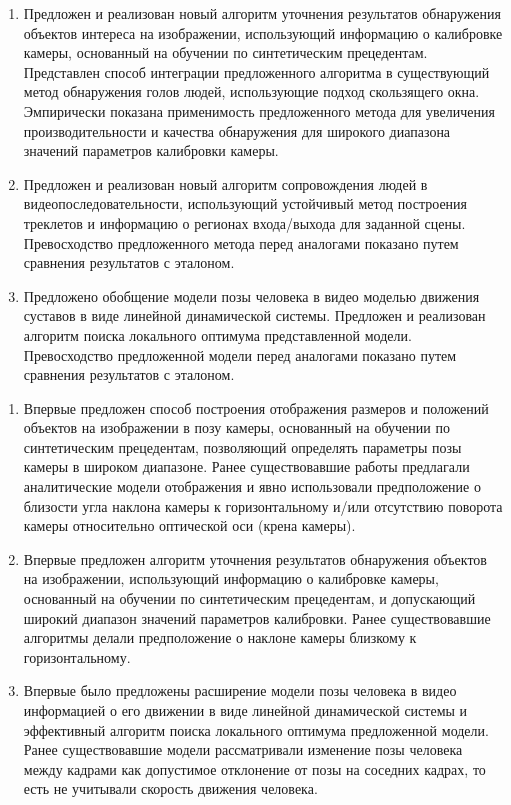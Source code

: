 {}
\begin{enumerate}
  \item Предложен и реализован новый алгоритм уточнения результатов обнаружения объектов интереса на изображении, использующий информацию о калибровке камеры, основанный на обучении по синтетическим прецедентам. Представлен способ интеграции предложенного алгоритма в существующий метод обнаружения голов людей, использующие подход скользящего окна. Эмпирически показана применимость предложенного метода для увеличения производительности и качества обнаружения для широкого диапазона значений параметров калибровки камеры.
  \item Предложен и реализован новый алгоритм сопровождения людей в видеопоследовательности, использующий устойчивый метод построения треклетов и информацию о регионах входа/выхода для заданной сцены. Превосходство предложенного метода перед аналогами показано путем сравнения результатов с эталоном.
  \item Предложено обобщение модели позы человека в видео моделью движения суставов в виде линейной динамической системы. Предложен и реализован алгоритм поиска локального оптимума представленной модели. Превосходство предложенной модели перед аналогами показано путем сравнения результатов с эталоном. 
\end{enumerate}

{\novelty}
\begin{enumerate}
  \item Впервые предложен способ построения отображения размеров и положений объектов на изображении в позу камеры, основанный на обучении по синтетическим прецедентам, позволяющий определять параметры позы камеры в широком диапазоне. Ранее существовавшие работы предлагали аналитические модели отображения и явно использовали предположение о близости угла наклона камеры к горизонтальному и/или отсутствию поворота камеры относительно оптической оси (крена камеры).
  \item Впервые предложен алгоритм уточнения результатов обнаружения объектов на изображении, использующий информацию о калибровке камеры, основанный на обучении по синтетическим прецедентам, и допускающий широкий диапазон значений параметров калибровки. Ранее существовавшие алгоритмы делали предположение о наклоне камеры близкому к горизонтальному.
  \item Впервые было предложены расширение модели позы человека в видео информацией о его движении в виде линейной динамической системы и эффективный алгоритм поиска локального оптимума предложенной модели. Ранее существовавшие модели рассматривали изменение позы человека между кадрами как допустимое отклонение от позы на соседних кадрах, то есть не учитывали скорость движения человека.
\end{enumerate}

